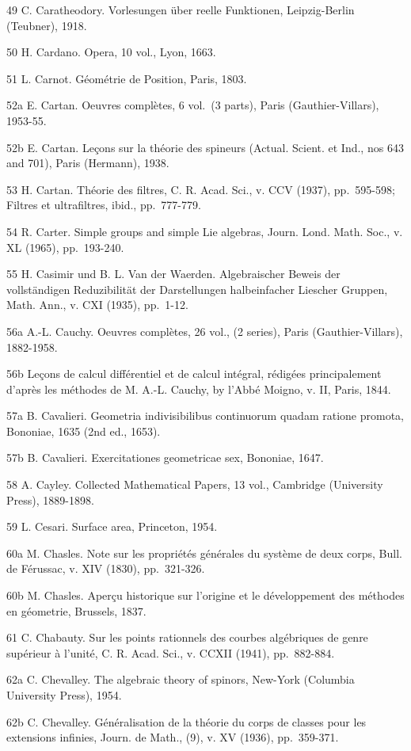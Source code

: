 49 C. Caratheodory. Vorlesungen über reelle Funktionen, Leipzig-Berlin (Teubner), 1918.

50 H. Cardano. Opera, 10 vol., Lyon, 1663.

51 L. Carnot. Géométrie de Position, Paris, 1803.

52a E. Cartan. Oeuvres complètes, 6 vol.~(3 parts), Paris (Gauthier-Villars), 1953-55.

52b E. Cartan. Leçons sur la théorie des spineurs (Actual. Scient. et Ind., nos 643 and 701), Paris (Hermann), 1938.

53 H. Cartan. Théorie des filtres, C. R. Acad. Sci., v. CCV (1937), pp.~595-598; Filtres et ultrafiltres, ibid., pp.~777-779.

54 R. Carter. Simple groups and simple Lie algebras, Journ. Lond. Math. Soc., v. XL (1965), pp.~193-240.

55 H. Casimir und B. L. Van der Waerden. Algebraischer Beweis der vollständigen Reduzibilität der Darstellungen halbeinfacher Liescher Gruppen, Math. Ann., v. CXI (1935), pp.~1-12.

56a A.-L. Cauchy. Oeuvres complètes, 26 vol., (2 series), Paris (Gauthier-Villars), 1882-1958.

56b Leçons de calcul différentiel et de calcul intégral, rédigées principalement d'après les méthodes de M. A.-L. Cauchy, by l'Abbé Moigno, v. II, Paris, 1844.

57a B. Cavalieri. Geometria indivisibilibus continuorum quadam ratione promota, Bononiae, 1635 (2nd ed., 1653).

57b B. Cavalieri. Exercitationes geometricae sex, Bononiae, 1647.

58 A. Cayley. Collected Mathematical Papers, 13 vol., Cambridge (University Press), 1889-1898.

59 L. Cesari. Surface area, Princeton, 1954.

60a M. Chasles. Note sur les propriétés générales du système de deux corps, Bull. de Férussac, v. XIV (1830), pp.~321-326.

60b M. Chasles. Aperçu historique sur l'origine et le développement des méthodes en géometrie, Brussels, 1837.

61 C. Chabauty. Sur les points rationnels des courbes algébriques de genre supérieur à l'unité, C. R. Acad. Sci., v. CCXII (1941), pp.~882-884.

62a C. Chevalley. The algebraic theory of spinors, New-York (Columbia University Press), 1954.

62b C. Chevalley. Généralisation de la théorie du corps de classes pour les extensions infinies, Journ. de Math., (9), v. XV (1936), pp.~359-371.

